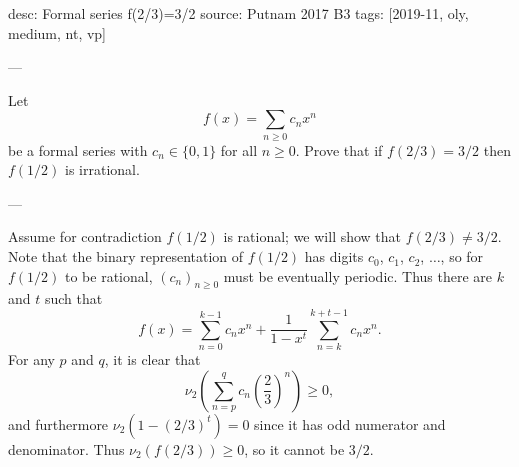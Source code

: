 desc: Formal series f(2/3)=3/2
source: Putnam 2017 B3
tags: [2019-11, oly, medium, nt, vp]

---

Let \[f(x)=\sum_{n\ge0}c_nx^n\]
be a formal series with $c_n\in\{0,1\}$ for all $n\ge0$. Prove that if $f(2/3)=3/2$ then $f(1/2)$ is irrational.

---

Assume for contradiction $f(1/2)$ is rational; we will show that $f(2/3)\ne3/2$. Note that the binary representation of $f(1/2)$ has digits $c_0$, $c_1$, $c_2$, $\ldots$, so for $f(1/2)$ to be rational, $(c_n)_{n\ge0}$ must be eventually periodic. Thus there are $k$ and $t$ such that \[f(x)=\sum_{n=0}^{k-1}c_nx^n+\frac1{1-x^t}\sum_{n=k}^{k+t-1}c_nx^n.\]
For any $p$ and $q$, it is clear that \[\nu_2\left(\sum_{n=p}^qc_n\left(\frac23\right)^n\right)\ge0,\]
and furthermore $\nu_2(1-(2/3)^t)=0$ since it has odd numerator and denominator. Thus $\nu_2(f(2/3))\ge0$, so it cannot be $3/2$.
